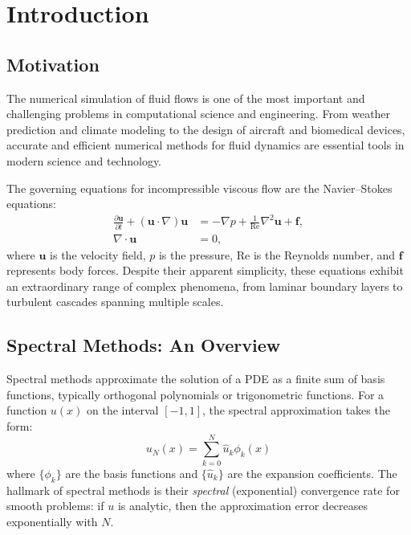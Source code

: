 \documentclass[12pt,a4paper,oneside]{report}
\begin{document}

\chapter{Introduction}
\label{ch:introduction}

\section{Motivation}

The numerical simulation of fluid flows is one of the most important and challenging problems in computational science and engineering. From weather prediction and climate modeling to the design of aircraft and biomedical devices, accurate and efficient numerical methods for fluid dynamics are essential tools in modern science and technology.

The governing equations for incompressible viscous flow are the Navier--Stokes equations:
\begin{align}
  \frac{\partial \mathbf{u}}{\partial t} + (\mathbf{u} \cdot \nabla)\mathbf{u} &= -\nabla p + \frac{1}{\text{Re}} \nabla^2 \mathbf{u} + \mathbf{f}, \label{eq:ns_momentum} \\
  \nabla \cdot \mathbf{u} &= 0, \label{eq:ns_continuity}
\end{align}
where $\mathbf{u}$ is the velocity field, $p$ is the pressure, $\text{Re}$ is the Reynolds number, and $\mathbf{f}$ represents body forces. Despite their apparent simplicity, these equations exhibit an extraordinary range of complex phenomena, from laminar boundary layers to turbulent cascades spanning multiple scales.

\section{Spectral Methods: An Overview}

Spectral methods approximate the solution of a PDE as a finite sum of basis functions, typically orthogonal polynomials or trigonometric functions. For a function $u(x)$ on the interval $[-1, 1]$, the spectral approximation takes the form:
\begin{equation}
  u_N(x) = \sum_{k=0}^{N} \hat{u}_k \phi_k(x)
\end{equation}
where $\{\phi_k\}$ are the basis functions and $\{\hat{u}_k\}$ are the expansion coefficients. The hallmark of spectral methods is their \textit{spectral} (exponential) convergence rate for smooth problems: if $u$ is analytic, then the approximation error decreases exponentially with $N$.
\end{document}
